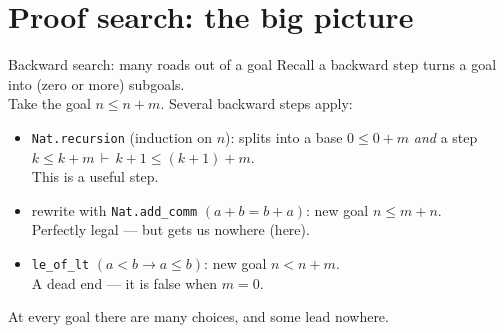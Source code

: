 \documentclass[aspectratio=169]{beamer}
\begin{document}
\section{Proof search: the big picture}

\begin{frame}{Backward search: many roads out of a goal}
  Recall a \alert{backward step} turns a goal into (zero or more) subgoals.
  \\[.4em]
  Take the goal $n \leq n+m$. Several backward steps apply:
  \medskip
  \begin{itemize}
    \item[\textcolor{sortcolor}{$\blacktriangleright$}]
      \texttt{Nat.recursion} (induction on $n$): splits into a
      \alert{base} $0 \leq 0+m$ \emph{and} a \alert{step}
      $k \leq k{+}m \,\vdash\, k{+}1 \leq (k{+}1){+}m$.
      \\{\footnotesize This is a useful step.}
    \item[\textcolor{black!45}{$\blacktriangleright$}]
      rewrite with \texttt{Nat.add\_comm} $(a+b = b+a)$: new goal
      $n \leq m+n$.
      \\{\footnotesize Perfectly legal --- but gets us nowhere (here).}
    \item[\textcolor{keywordcolor}{$\blacktriangleright$}]
      \texttt{le\_of\_lt} $(a < b \to a \leq b)$: new goal $n < n+m$.
      \\{\footnotesize A dead end --- it is \alert{false} when $m = 0$.}
  \end{itemize}
  \medskip
  At every goal there are \alert{many choices}, and some lead nowhere.
\end{frame}
\end{document}
